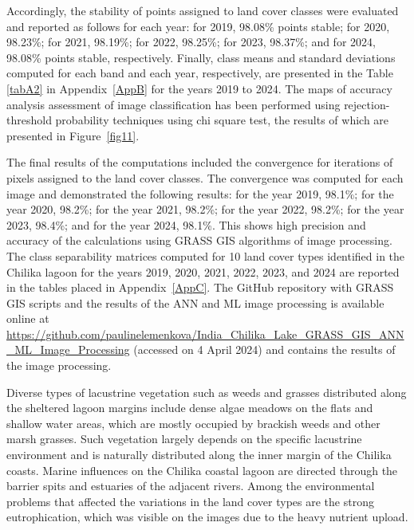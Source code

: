 \documentclass[jmse,article,accept,pdftex,oneauthor]{Definitions/mdpi}
\begin{document}
Accordingly, the stability of points assigned to land cover classes were evaluated and reported as follows for each year: for 2019, 98.08\% points stable; for 2020, 98.23\%; for 2021, 98.19\%; for 2022, 98.25\%; for 2023, 98.37\%; and for 2024, 98.08\% points stable, respectively. Finally, class means and standard deviations computed for each band and each year, respectively, are presented in the Table \ref{tabA2} in Appendix~\ref{AppB} for the years 2019 to 2024. The maps of accuracy analysis assessment  of image classification has been performed using rejection-threshold probability techniques using chi square test, the results of  which are  presented in Figure~\ref{fig11}. 

The final results of the computations included the convergence for iterations of pixels assigned to the land cover classes. The convergence was computed for each image and demonstrated the following results: for the year 2019, 98.1\%; for the year 2020, 98.2\%; for the year 2021, 98.2\%; {for the year 2022, 98.2\%; } %
for the year 2023, 98.4\%; and for the year 2024, 98.1\%. This   shows high precision and accuracy of the calculations using GRASS GIS algorithms of image processing. The class separability matrices computed for 10 land cover types identified in the Chilika lagoon for the years 2019, 2020, 2021, 2022, 2023, and 2024 are reported in the tables placed in   Appendix~\ref{AppC}. The GitHub repository with GRASS GIS scripts and the results of the ANN and ML image processing is available online at \url{https://github.com/paulinelemenkova/India\_Chilika\_Lake\_GRASS\_GIS\_ANN\_ML\_Image\_Processing} (accessed on 4 April 2024) and contains the results of the image processing. 
 
 Diverse types of lacustrine vegetation such as weeds and grasses distributed along the sheltered lagoon margins include dense algae meadows on the flats and shallow water areas, which are mostly occupied by brackish weeds and other marsh grasses. Such vegetation largely depends on the specific lacustrine environment and is naturally distributed along the inner margin of the Chilika coasts. Marine influences on the Chilika coastal lagoon are directed through the barrier spits and estuaries of the adjacent rivers. Among the environmental problems that affected the variations in the land cover types are the strong eutrophication, which was visible on the images due to the heavy nutrient upload. 
\end{document}
